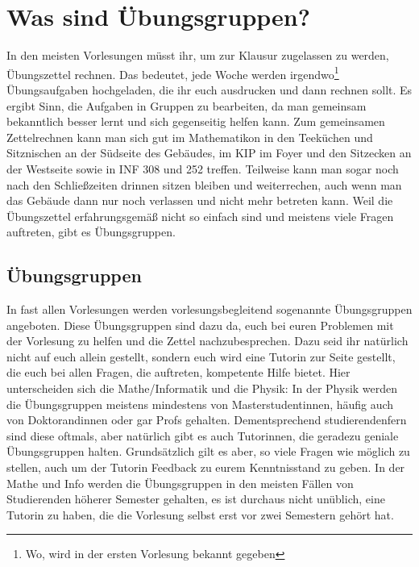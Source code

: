 
\section{Was sind Übungsgruppen?}
\label{uebungsgruppen}
\noindent In den meisten Vorlesungen müsst ihr, um zur Klausur zugelassen zu werden, Übungszettel rechnen. Das bedeutet, jede Woche werden irgendwo\footnote{Wo, wird in der ersten Vorlesung bekannt gegeben} Übungsaufgaben hochgeladen, die ihr euch ausdrucken und dann rechnen sollt. Es ergibt Sinn, die Aufgaben in Gruppen zu bearbeiten, da man gemeinsam bekanntlich besser lernt und sich gegenseitig helfen kann. Zum gemeinsamen Zettelrechnen kann man sich gut im Mathematikon in den Teeküchen und Sitznischen an der Südseite des Gebäudes, im \gls{KIP} im Foyer und den Sitzecken an der Westseite sowie in INF 308 und 252 treffen. Teilweise kann man sogar noch nach den Schließzeiten drinnen sitzen bleiben und weiterrechen, auch wenn man das Gebäude dann nur noch verlassen und nicht mehr betreten kann. Weil die Übungszettel erfahrungsgemäß nicht so einfach sind und meistens viele Fragen auftreten, gibt es Übungsgruppen.

\subsection{Übungsgruppen}
In fast allen Vorlesungen werden vorlesungsbegleitend sogenannte Übungsgruppen angeboten. Diese Übungsgruppen sind dazu da, euch bei euren Problemen mit der Vorlesung zu helfen und die Zettel nachzubesprechen. Dazu seid ihr natürlich nicht auf euch allein gestellt, sondern euch wird eine Tutorin zur Seite gestellt, die euch bei allen Fragen, die auftreten, kompetente Hilfe bietet. Hier unterscheiden sich die Mathe/Informatik und die Physik: In der Physik werden die Übungsgruppen meistens mindestens von Masterstudentinnen, häufig auch von Doktorandinnen oder gar Profs gehalten. Dementsprechend studierendenfern sind diese oftmals, aber natürlich gibt es auch Tutorinnen, die geradezu geniale Übungsgruppen halten. Grundsätzlich gilt es aber, so viele Fragen wie möglich zu stellen, auch um der Tutorin Feedback zu eurem Kenntnisstand zu geben. In der Mathe und Info werden die Übungsgruppen in den meisten Fällen von Studierenden höherer Semester gehalten, es ist durchaus nicht unüblich, eine Tutorin zu haben, die die Vorlesung selbst erst vor zwei Semestern gehört hat.

